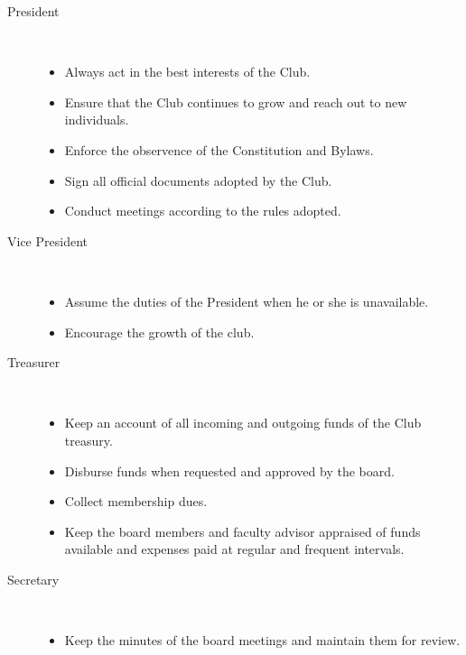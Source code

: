 \documentclass{article}
\begin{document}
    \begin{description}
        \item[President] ~\\
          \vspace{-12pt}
          \begin{itemize}
            \item Always act in the best interests of the Club.
            \item Ensure that the Club continues to grow and reach out to new individuals.
            \item Enforce the observence of the Constitution and Bylaws.
            \item Sign all official documents adopted by the Club.
            \item Conduct meetings according to the rules adopted.
          \end{itemize}
        \item[Vice President] ~\\
          \vspace{-12pt}
          \begin{itemize}
            \item Assume the duties of the President when he or she is unavailable.
            \item Encourage the growth of the club.
          \end{itemize}
        \item[Treasurer] ~\\
          \vspace{-12pt}
          \begin{itemize}
            \item Keep an account of all incoming and outgoing funds of the Club treasury.
            \item Disburse funds when requested and approved by the board.
            \item Collect membership dues.
            \item Keep the board members and faculty advisor appraised of funds available and expenses paid at regular and frequent intervals.
          \end{itemize}
        \item[Secretary] ~\\
          \vspace{-12pt}
          \begin{itemize}
            \item Keep the minutes of the board meetings and maintain them for review.

\end{itemize}
\end{description}
\end{document}
